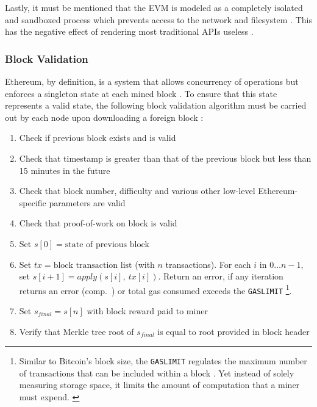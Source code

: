 Lastly, it must be mentioned that the \ac{EVM} is modeled as a completely isolated and sandboxed process which prevents access to the network and filesystem \cite[p.~19]{solidityDocs}. This has the negative effect of rendering most traditional \acsp{API} useless \cite[p.~46]{Raval.2016}. 


%

\subsubsection{Block Validation}
Ethereum, by definition, is a system that allows concurrency of operations but enforces a singleton state at each mined block \cite[p.~151]{Antonopoulos.2018}. To ensure that this state represents a valid state, the following block validation algorithm must be carried out by each node upon downloading a foreign block \cite[p.~57]{Antonopoulos.2018} \cite[pp.~23]{ethereumWhitepaperGitHub}:

\begin{enumerate}
  \item Check if previous block exists and is valid
  \item Check that timestamp is greater than that of the previous block but less than 15 minutes in the future
  \item Check that block number, difficulty and various other low-level Ethereum-specific parameters are valid
  \item Check that proof-of-work on block is valid
  \item Set $s[0] = \text{state of previous block}$ 
  \item Set $tx = \text{block transaction list}$  (with $n$ transactions). For each $i$ in $0 \dots n-1$, set $s[i+1] = apply(s[i],\ tx[i])$. Return an error, if any iteration returns an error (comp.~) or total gas consumed exceeds the \texttt{GASLIMIT} \footnote{Similar to Bitcoin's block size, the \texttt{GASLIMIT} regulates the maximum number of transactions that can be included within a block \cite{blocksizeControversy} \cite[p.~8]{ethereumYellowPaper}. Yet instead of solely measuring storage space, it limits the amount of computation that a miner must expend. \label{ftn:gasLimit}}.
  \item Set $s_{final} = s[n]$ with block reward paid to miner
  \item Verify that Merkle tree root of $s_{final}$ is equal to root provided in block header
\end{enumerate}

